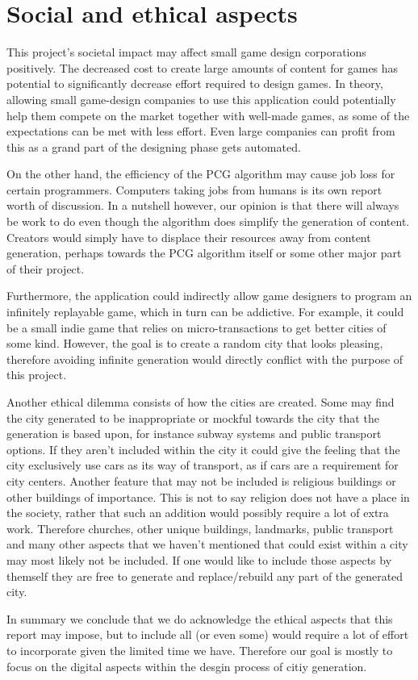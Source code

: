 \section{Social and ethical aspects}
This project's societal impact may affect small game design corporations positively.
The decreased cost to create large amounts of content for games has potential to significantly decrease effort required to design games.
In theory, allowing small game-design companies to use this application could potentially help them compete on the market together with well-made games, as some of the expectations can be met with less effort.
Even large companies can profit from this as a grand part of the designing phase gets automated.

On the other hand, the efficiency of the PCG algorithm may cause job loss for certain programmers.
Computers taking jobs from humans is its own report worth of discussion.
In a nutshell however, our opinion is that there will always be work to do even though the algorithm does simplify the generation of content.
Creators would simply have to displace their resources away from content generation, perhaps towards the PCG algorithm itself or some other major part of their project.

Furthermore, the application could indirectly allow game designers to program an infinitely replayable game, which in turn can be addictive.
For example, it could be a small indie game that relies on micro-transactions to get better cities of some kind.
However, the goal is to create a random city that looks pleasing, therefore avoiding infinite generation would directly conflict with the purpose of this project.

Another ethical dilemma consists of how the cities are created.
Some may find the city generated to be inappropriate or mockful towards the city that the generation is based upon,
for instance subway systems and public transport options.
If they aren't included within the city it could give the feeling that the city exclusively use cars as its way of transport, as if cars are a requirement for city centers.
Another feature that may not be included is religious buildings or other buildings of importance.
This is not to say religion does not have a place in the society, rather that such an addition would possibly require a lot of extra work.
Therefore churches, other unique buildings, landmarks, public transport and many other aspects that we haven't mentioned that could exist within a city may most likely not be included.
If one would like to include those aspects by themself they are free to generate and replace/rebuild any part of the generated city.

In summary we conclude that we do acknowledge the ethical aspects that this report may impose, but to include all (or even some) would require a lot of effort to incorporate given the limited time we have.
Therefore our goal is mostly to focus on the digital aspects within the desgin process of citiy generation. 